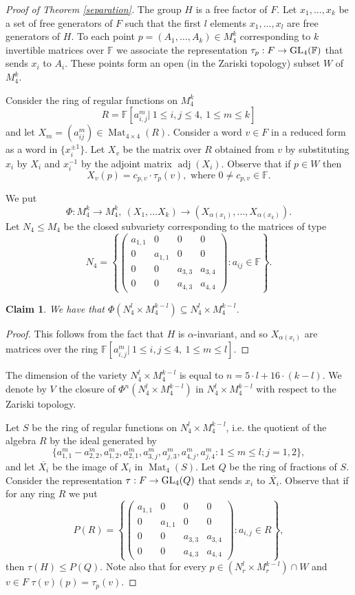 \documentclass{amsart}
\newtheorem{claim}[lem]{Claim}
\theoremstyle{definition}
\theoremstyle{remark}
\DeclareMathOperator{\adj}{adj}
\DeclareMathOperator{\Mat}{Mat}
\newcommand{\F}{\mathbb{F}}
\begin{document}
\begin{proof}[Proof of Theorem \ref{separation}]
The group $H$  is a free factor of $F$. Let $x_1,\ldots, x_k$ be a set of free generators of $F$ such that the first $l$ elements $x_1,\ldots, x_l$ are free generators of $H$.  To  each point $p=(A_1,\ldots, A_k)\in M_4^k$ corresponding to $k$ invertible matrices over $\F$ we associate the representation $\tau_p:F\to \GL_4(\F)$ that sends $x_i$ to $A_i$. These points form 
an open (in the Zariski topology) subset $W$ of $M_4^k$.

Consider the ring of regular functions on $M_4^k$
$$R=\F[a_{i,j}^m|\ 1\le i,j\le 4, \ 1\le m\le k]$$ and let $X_m=(a_{ij}^m)\in \Mat_{4\times 4}(R)$.
Consider a  word $v\in F$ in a reduced form as a word in $\{x_i^{\pm 1}\}$. 
Let $X_v$ be the matrix over $R$ obtained from $v$ by substituting $x_i$ by $X_i$ and $x_i^{-1}$ by the adjoint matrix $\adj (X_i)$.  Observe that if $p\in W$ then $$X_v(p)=c_{p,v}\cdot \tau_p(v), \textrm{\ where \ } 0\ne c_{p,v}\in \F.$$


We put
$$ \Phi:M_4^k\to M_4^k, \ \left (X_1,\ldots X_k \right )\to \left  (X_{\alpha(x_1)},\ldots, X_{\alpha(x_k)}\right ).$$
Let $N_4\le M_4$ be the closed subvariety corresponding  to the matrices of type 
$$N_4=\left \{\left ( \begin{array}{cccc}
a_{1,1} & 0 & 0 & 0\\
0 &a_{1,1} & 0 & 0 \\
0 & 0 & a_{3,3} & a_{3,4}\\
0 & 0 &a_{4,3} & a_{4,4} \end{array}
\right ): a_{ij}\in \F\right\}.$$
  \begin{claim}
We have that $\Phi(N_4^l\times M_4^{k-l})\subseteq N_4^l\times M_4^{k-l}$.
\end{claim}
\begin{proof}
This follows from the fact that $H$ is $\alpha$-invariant, and so $X_{\alpha(x_i)}$ are matrices over the ring $\F[a_{i,j}^m|\ 1\le i,j\le 4,\  1\le m\le l]$.
\end{proof}
The dimension of the variety $N_4^l\times M_4^{k-l}$ is equal to $n=5\cdot l+16\cdot (k-l)$.
We denote by $V$ the closure of $\Phi^n(N_4^l\times M_4^{k-l})$ in $N_4^l\times M_4^{k-l}$ with respect to the Zariski topology. 

Let $S$ be the ring of regular functions on $N_4^l\times M_4^{k-l}$, i.e. the quotient of the algebra $R$ by the ideal generated by 
$$\{a_{1,1}^m-a_{2,2}^m, a_{1,2}^m, a_{2,1}^m, a_{3,j}^m, a_{j,3}^m, a_{4,j}^m, a_{j,4}^m\colon 1\le m\le l; j=1,2\},$$ and let $\overline {X_i}$ be the image of $X_i$ in $\Mat_4(S)$. Let $Q$ be the ring of fractions of $S$. Consider the representation $\tau: F\to \operatorname{GL}_4(Q)$ that sends $x_i$ to $\overline{X_i}$. Observe that  if  for any ring $R$ we put 
$$P(R)= \left \{\left ( \begin{array}{cccc}
a_{1,1} & 0 & 0 & 0\\
0 &a_{1,1} & 0 & 0 \\
0 & 0 & a_{3,3} & a_{3,4}\\
0 & 0 &a_{4,3} & a_{4,4} \end{array}
\right ): a_{i,j}\in R\right \},$$
then $\tau(H)\le P(Q)$. Note also that for every $p\in (N_r^l\times M_r^{k-l})\cap W$ and  $v\in F$
$ \tau(v)(p)=\tau_p(v).$


\end{proof}
\end{document}
